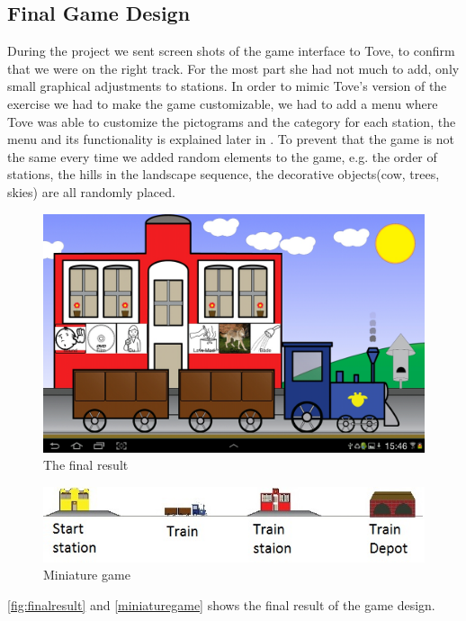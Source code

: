 \subsection{Final Game Design}\label{sec:finalgame}
\label{designgameinterface}
During the project we sent screen shots of the game interface to Tove, to confirm that we were on the right track. For the most part she had not much to add, only small graphical adjustments to stations. 
In order to mimic Tove's version of the exercise we had to make the game customizable, we had to add a menu where Tove was able to customize the pictograms and the category for each station, the menu and its functionality is explained later in . To prevent that the game is not the same every time we added random elements to the game, e.g. the order of stations, the hills in the landscape sequence, the decorative objects(cow, trees, skies) are all randomly placed. 
\begin{figure}[H]
\centering
\includegraphics[width=0.9\linewidth]{img/screenshots/gamedesign1.jpg}%
\caption{The final result}
\label{fig:finalresult}
\end{figure}
\begin{figure}[H]
\centering
\includegraphics[width=0.9\linewidth]{img/screenshots/stations.jpg}%
\caption{Miniature game}
\label{fig:miniaturegame}
\end{figure}
\autoref{fig:finalresult} and \autoref{miniaturegame} shows the final result of the game design. 
